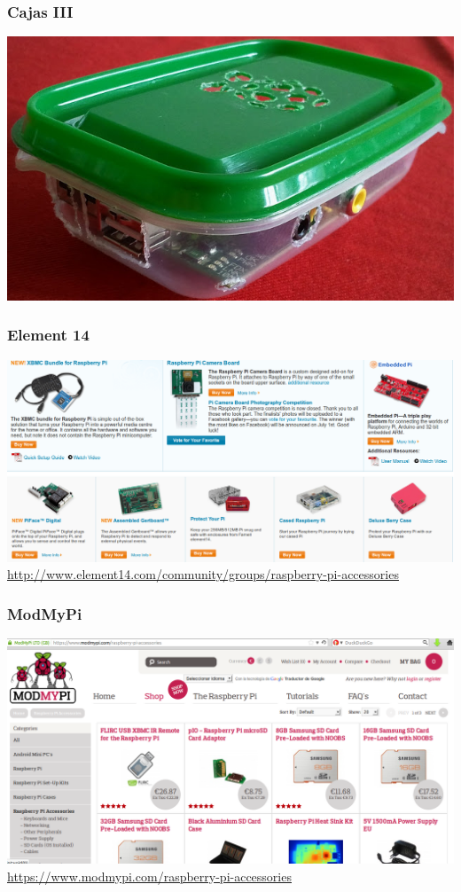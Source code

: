 \documentclass[10pt,colorlinks]{beamer}
\begin{document}
\begin{frame}\frametitle{Cajas III}

   \includegraphics[width=\textwidth]{figs/case5}

\end{frame}
 
\begin{frame}[plain]\frametitle{Element 14}

   \includegraphics[width=\textwidth]{figs/element}\\
\href{http://www.element14.com/community/groups/raspberry-pi-accessories}{http://www.element14.com/community/groups/raspberry-pi-accessories}
\end{frame}


\begin{frame}[fragile]\frametitle{ModMyPi}
   \includegraphics[width=\textwidth]{figs/modmypi}\\
\href{https://www.modmypi.com/raspberry-pi-accessories}{https://www.modmypi.com/raspberry-pi-accessories}

\end{frame}
\end{document}
